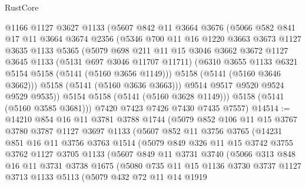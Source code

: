 \begin{lexlean}{RustCore}
\begin{coremodule}
          @1166
          @1127
          @3627
          @1133
          (@5607
            @842
            @11
            @3664
            @3676
            (@5066
              @582
              @841
              @17
              @11
              @3664
              @3674
              @2356
              (@5346
                @700
                @11
                @16
                @1220
                @3663
                @3673
                @1127
                @3635
                @1133
                @5365
                (@5079
                  @698
                  @211
                  @11
                  @15
                  @3046
                  @3662
                  @3672
                  @1127
                  @3645
                  @1133
                  (@5131 @697 @3046 @11707 @11711)
                  (@6310 @3655 @1133 @6321 @5154 @5158 (@5141 (@5160 @3656 @1149)))
                  @5158
                  (@5141 (@5160 @3646 @3662)))
                @5158
                (@5141 (@5160 @3636 @3663)))
              @9514
              @9517
              @9520
              @9524
              @9529
              @9535))
          @5154
          @5158
          (@5141 (@5160 @3628 @1149)))
        @5158
        (@5141 (@5160 @3585 @3681)))
      @7420
      @7423
      @7426
      @7430
      @7435
      @7557)
@14514 := @14210
    @854
    @16
    @11
    @3781
    @3788
    @1744
    (@5079
      @852
      @106
      @11
      @15
      @3767
      @3780
      @3787
      @1127
      @3697
      @1133
      (@5607
        @852
        @11
        @3756
        @3765
        (@14231
          @851
          @16
          @11
          @3756
          @3763
          @1514
          (@5079
            @849
            @326
            @11
            @15
            @3742
            @3755
            @3762
            @1127
            @3705
            @1133
            (@5607
              @849
              @11
              @3731
              @3740
              (@5066
                @313
                @848
                @16
                @11
                @3731
                @3738
                @1675
                (@5080
                  @735
                  @11
                  @15
                  @1136
                  @3730
                  @3737
                  @1127
                  @3713
                  @1133
                  @5113
                  (@5079
                    @432
                    @72
                    @11
                    @14
                    @1919

\end{coremodule}
\end{lexlean}
